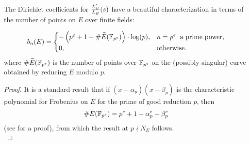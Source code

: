 The Dirichlet coefficients for $\frac{L_E^{\prime}}{L_E}(s)$ have a beautiful characterization in terms of the number of points on $E$ over finite fields:
\begin{proposition}
\begin{equation}
b_n(E) = \begin{cases}
-\left(p^e + 1 - \#\widetilde{E}(\mathbb{F}_{p^e})\right)\cdot \log(p), & n=p^e\;\;\text{a prime power,} \\
0, & \text{otherwise.} \end{cases}
\end{equation}
where $\#\widetilde{E}(\mathbb{F}_{p^e})$ is the number of points over $\mathbb{F}_{p^e}$ on the (possibly singular) curve obtained by reducing $E$ modulo $p$.
\end{proposition}

\begin{proof}
It is a standard result that if $(x-\alpha_p)(x-\beta_p)$ is the characteristic polynomial for Frobenius on $E$ for the prime of good reduction $p$, then
\begin{equation}
\#E(\mathbb{F}_{p^e}) = p^e + 1 - \alpha_p^e - \beta_p^e
\end{equation}
(see \cite[pp. 134-136]{Sil-1985} for a proof), from which the result at $p \nmid N_E$ follows. \\


\end{proof}
